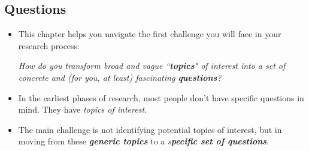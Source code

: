 \documentclass[11pt]{article}
\begin{document}
\subsection{Questions}
\begin{itemize}
\item This chapter helps you navigate the first challenge you will face in your research process: 

\emph{How do you transform broad and vague ``\textbf{topics}" of interest into a set of concrete and (for you, at least) fascinating \textbf{questions}?} 

\item In the earliest phases of research, most people don’t have specific questions in mind. They have \emph{topics of interest}. 

\item The main challenge is not identifying potential topics of interest, but in moving from these \emph{\textbf{generic topics}} to a \emph{s\textbf{pecific set of questions}}. 
\end{itemize}
\end{document}
